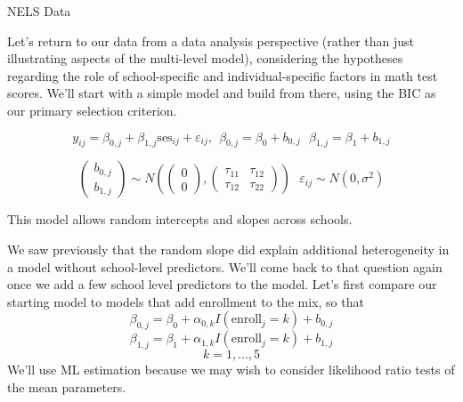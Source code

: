 \documentclass[ignorenonframetext,]{beamer}
\begin{document}
\begin{frame}{NELS Data}

Let's return to our data from a data analysis perspective (rather than
just illustrating aspects of the multi-level model), considering the
hypotheses regarding the role of school-specific and individual-specific
factors in math test scores. We'll start with a simple model and build
from there, using the BIC as our primary selection criterion.

\[y_{ij}=\beta_{0,j}+\beta_{1,j}\text{ses}_{ij}+ \varepsilon_{ij}, ~~ \beta_{0,j}=\beta_0+b_{0,j} ~~~ \beta_{1,j}=\beta_1+b_{1,j}\]

\[\begin{pmatrix} b_{0,j} \\ b_{1,j} \end{pmatrix} \sim N \left(\begin{pmatrix} 0 \\ 0 \end{pmatrix}, \begin{pmatrix}\tau_{11} & \tau_{12} \\ \tau_{12} & \tau_{22} \end{pmatrix}\right) ~~~ \varepsilon_{ij}\sim N(0,\sigma^2)\]

This model allows random intercepts and slopes across schools.

\end{frame}

\begin{frame}{}

We saw previously that the random slope did explain additional
heterogeneity in a model without school-level predictors. We'll come
back to that question again once we add a few school level predictors to
the model. Let's first compare our starting model to models that add
enrollment to the mix, so that
\[\beta_{0,j}=\beta_0+\alpha_{0,k}I(\text{enroll}_j=k)+b_{0,j}\]
\[\beta_{1,j}=\beta_1+\alpha_{1,k}I(\text{enroll}_j=k)+b_{1,j}\]
\[k=1,...,5\] We'll use ML estimation because we may wish to consider
likelihood ratio tests of the mean parameters.

\end{frame}
\end{document}
